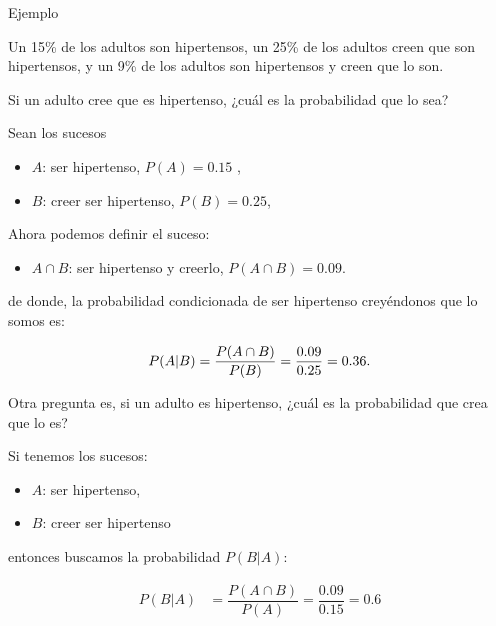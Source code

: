 \documentclass[
  letterpaper,
  DIV=11,
  numbers=noendperiod]{scrreprt}
\providecommand{\tightlist}{%
  \setlength{\itemsep}{0pt}\setlength{\parskip}{0pt}}\usepackage{longtable,booktabs,array}
\begin{document}
\begin{Ejemplo}{Ejemplo}{}

Un 15\% de los adultos son hipertensos, un 25\% de los adultos creen que
son hipertensos, y un 9\% de los adultos son hipertensos y creen que lo
son.

Si un adulto cree que es hipertenso, ¿cuál es la probabilidad que lo
sea?

Sean los sucesos

\begin{itemize}
\tightlist
\item
  \(A\): ser hipertenso, \(P(A)=0.15\) ,
\item
  \(B\): creer ser hipertenso, \(P(B)=0.25\),
\end{itemize}

Ahora podemos definir el suceso:

\begin{itemize}
\tightlist
\item
  \(A\cap B\): ser hipertenso y creerlo, \(P(A\cap B)=0.09\).
\end{itemize}

de donde, la probabilidad condicionada de ser hipertenso creyéndonos que
lo somos es:

\[\scriptsize P(A|B)=\dfrac{P(A\cap B)}{P(B)}=\dfrac{0.09}{0.25}=0.36.\]

Otra pregunta es, si un adulto es hipertenso, ¿cuál es la probabilidad
que crea que lo es?

Si tenemos los sucesos:

\begin{itemize}
\tightlist
\item
  \(A\): ser hipertenso,
\item
  \(B\): creer ser hipertenso
\end{itemize}

entonces buscamos la probabilidad \(P(B|A)\):

\[
\begin{array}{rl}
P(B|A) & =\dfrac{P(A\cap B)}{P(A)}=\dfrac{0.09}{0.15}=
0.6
\end{array}
\]

\end{Ejemplo}
\end{document}
